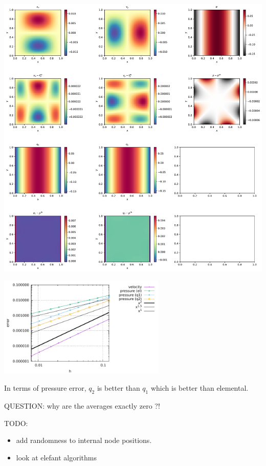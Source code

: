 \includegraphics[width=15cm]{python_codes/fieldstone_consistent_pressure_recovery/solution}

\includegraphics[width=8cm]{python_codes/fieldstone_consistent_pressure_recovery/errors}

In terms of pressure error, $q_2$ is better than $q_1$ which is better than elemental.

QUESTION: why are the averages exactly zero ?!

TODO: 
\begin{itemize}
\item add randomness to internal node positions.
\item look at elefant algorithms
\end{itemize}
